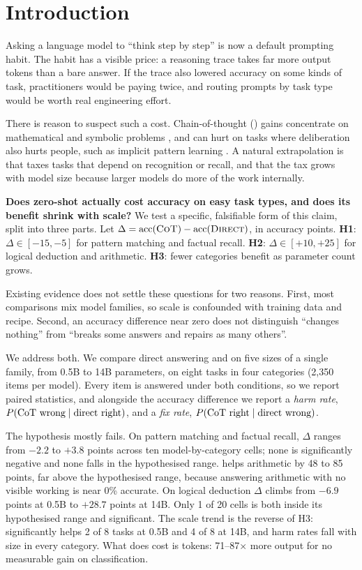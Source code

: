 \section{Introduction}
\label{sec:intro}

Asking a language model to ``think step by step'' is now a default prompting habit.
The habit has a visible price: a reasoning trace takes far more output tokens than a bare answer.
If the trace also lowered accuracy on some kinds of task, practitioners would be paying twice, and routing prompts by task type would be worth real engineering effort.

There is reason to suspect such a cost.
Chain-of-thought (\CoT) gains concentrate on mathematical and symbolic problems \cite{wei2022chain,kojima2022large,sprague2024cot}, and \CoT can hurt on tasks where deliberation also hurts people, such as implicit pattern learning \cite{liu2024mind}.
A natural extrapolation is that \CoT taxes tasks that depend on recognition or recall, and that the tax grows with model size because larger models do more of the work internally.

{\bf Does zero-shot \CoT actually cost accuracy on easy task types, and does its benefit shrink with scale?}
We test a specific, falsifiable form of this claim, split into three parts.
Let $\Delta = \mathrm{acc}(\textsc{CoT}) - \mathrm{acc}(\textsc{Direct})$, in accuracy points.
{\bf H1}: $\Delta \in [-15,-5]$ for pattern matching and factual recall.
{\bf H2}: $\Delta \in [+10,+25]$ for logical deduction and arithmetic.
{\bf H3}: fewer categories benefit as parameter count grows.

Existing evidence does not settle these questions for two reasons.
First, most comparisons mix model families, so scale is confounded with training data and recipe.
Second, an accuracy difference near zero does not distinguish ``\CoT changes nothing'' from ``\CoT breaks some answers and repairs as many others''.

We address both.
We compare direct answering and \CoT on five sizes of a single family, \qwen from 0.5B to 14B parameters, on eight tasks in four categories (2,350 items per model).
Every item is answered under both conditions, so we report paired statistics, and alongside the accuracy difference we report a \emph{harm rate}, $P(\text{\CoT wrong}\mid\text{direct right})$, and a \emph{fix rate}, $P(\text{\CoT right}\mid\text{direct wrong})$.

The hypothesis mostly fails.
On pattern matching and factual recall, $\Delta$ ranges from $-2.2$ to $+3.8$ points across ten model-by-category cells; none is significantly negative and none falls in the hypothesised range.
\CoT helps arithmetic by 48 to 85 points, far above the hypothesised range, because answering arithmetic with no visible working is near 0\% accurate.
On logical deduction $\Delta$ climbs from $-6.9$ points at 0.5B to $+28.7$ points at 14B.
Only 1 of 20 cells is both inside its hypothesised range and significant.
The scale trend is the reverse of H3: \CoT significantly helps 2 of 8 tasks at 0.5B and 4 of 8 at 14B, and harm rates fall with size in every category.
What \CoT does cost is tokens: 71--87$\times$ more output for no measurable gain on classification.

